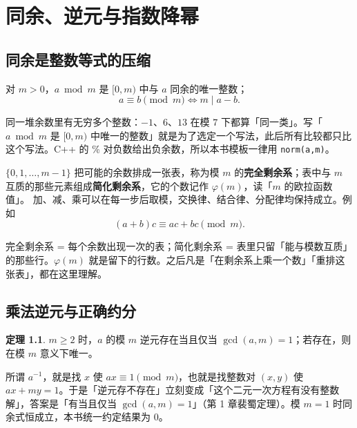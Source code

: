 \documentclass[UTF8,a4paper,11pt,oneside,openany,fontset=fandol]{ctexbook}
\theoremstyle{definition}
\newtheorem{theorem}[definition]{定理}
\begin{document}
\chapter{同余、逆元与指数降幂}
\section{同余是整数等式的压缩}
对 $m>0$，$a\bmod m$ 是 $[0,m)$ 中与 $a$ 同余的唯一整数；
\[
 a\equiv b\pmod m\iff m\mid a-b.
\]

\begin{tip}
同一堆余数里有无穷多个整数：$-1$、$6$、$13$ 在模 $7$ 下都算「同一类」。写「$a\bmod m$ 是 $[0,m)$ 中唯一的整数」就是为了选定一个写法，此后所有比较都只比这个写法。C++ 的 \% 对负数给出负余数，所以本书模板一律用 \texttt{norm(a,m)}。
\end{tip}

$\{0,1,\ldots,m-1\}$ 把可能的余数排成一张表，称为模 $m$ 的\textbf{完全剩余系}；表中与 $m$ 互质的那些元素组成\textbf{简化剩余系}，它的个数记作 $\varphi(m)$，读「$m$ 的欧拉函数值」。
加、减、乘可以在每一步后取模，交换律、结合律、分配律均保持成立。例如
\[
 (a+b)c\equiv ac+bc\pmod m.
\]

\begin{tip}[剩余系 = 一张余数表]
完全剩余系 = 每个余数出现一次的表；简化剩余系 = 表里只留「能与模数互质」的那些行。$\varphi(m)$ 就是留下的行数。之后凡是「在剩余系上乘一个数」「重排这张表」，都在这里理解。
\end{tip}


\section{乘法逆元与正确约分}
\begin{theorem}
$m\ge2$ 时，$a$ 的模 $m$ 逆元存在当且仅当 $\gcd(a,m)=1$；若存在，则在模 $m$ 意义下唯一。
\end{theorem}

\begin{tip}
所谓 $a^{-1}$，就是找 $x$ 使 $ax\equiv1\pmod m$，也就是找整数对 $(x,y)$ 使 $ax+my=1$。于是「逆元存不存在」立刻变成「这个二元一次方程有没有整数解」，答案是「有当且仅当 $\gcd(a,m)=1$」（第 1 章裴蜀定理）。模 $m=1$ 时同余式恒成立，本书统一约定结果为 $0$。
\end{tip}
\end{document}
